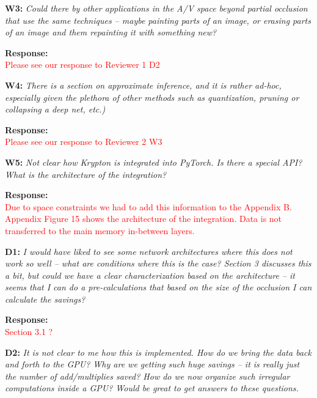 \documentclass[preprint]{vldb}
\newcommand{\red}{\textcolor{red}}
\begin{document}
\vspace{2mm}
\noindent \textbf{W3:} \textit{Could there by other applications in the A/V space beyond partial occlusion that use the same techniques -- maybe painting parts of an image, or erasing parts of an image and them repainting it with something new?}

\vspace{2mm}
\noindent \textbf{Response:}\\
\red{Please see our response to Reviewer 1 D2}

\vspace{2mm}
\noindent \textbf{W4:} \textit{There is a section on approximate inference, and it is rather ad-hoc, especially given the plethora of other methods such as quantization, pruning or collapsing a deep net, etc.)}

\vspace{2mm}
\noindent \textbf{Response:}\\
\red{Please see our response to Reviewer 2 W3}

\vspace{2mm}
\noindent \textbf{W5:} \textit{Not clear how Krypton is integrated into PyTorch. Is there a special API? What is the architecture of the integration?}

\vspace{2mm}
\noindent \textbf{Response:}\\
\red{Due to space constraints we had to add this information to the Appendix B. Appendix Figure 15 shows the architecture of the integration. Data is not transferred to the main memory in-between layers.}

\vspace{2mm}
\noindent \textbf{D1:} \textit{I would have liked to see some network architectures where this does not work so well -- what are conditions where this is the case? Section 3 discusses this a bit, but could we have a clear characterization based on the architecture -- it seems that I can do a pre-calculations that based on the size of the occlusion I can calculate the savings?}

\vspace{2mm}
\noindent \textbf{Response:}\\
\red{Section 3.1 ?}

\vspace{2mm}
\noindent \textbf{D2:} \textit{It is not clear to me how this is implemented. How do we bring the data back and forth to the GPU? Why are we getting such huge savings -- it is really just the number of add/multiplies saved? How do we now organize such irregular computations inside a GPU? Would be great to get answers to these questions.}
\end{document}
